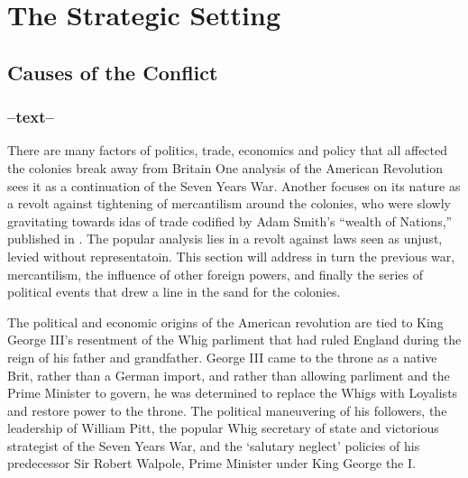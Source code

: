 \section{The Strategic Setting}
\doublespace
\subsection{Causes of the Conflict}

\subsubsection{--text--}

There are many factors of politics, trade, economics and policy that all
affected the colonies break away from Britain One analysis of the American
Revolution sees it as a continuation of the Seven Years War. Another focuses on
its nature as a revolt against tightening of mercantilism around the colonies,
who were slowly gravitating towards idas of trade codified by Adam Smith's
``wealth of Nations,'' published in . The popular analysis lies in a
revolt against laws seen as unjust, levied without representatoin. This section
will address in turn the previous war, mercantilism, the influence of other
foreign powers, and finally the series of political events that drew a line in
the sand for the colonies.



The political and economic origins of the American revolution are tied to King
George III's resentment of the Whig parliment that had ruled England during the
reign of his father and grandfather. George III came to the throne as a native
Brit, rather than a German import, and rather than allowing parliment and the
Prime Minister to govern, he was determined to replace the Whigs with Loyalists
and restore power to the throne. The political maneuvering of his followers,
the leadership of William Pitt, the popular Whig secretary of state and
victorious strategist of the Seven Years War, and the `salutary
neglect'  policies of his predecessor Sir Robert Walpole, Prime Minister under
King George the I.\cite[Ch 1-4]{cook_long_1995}

